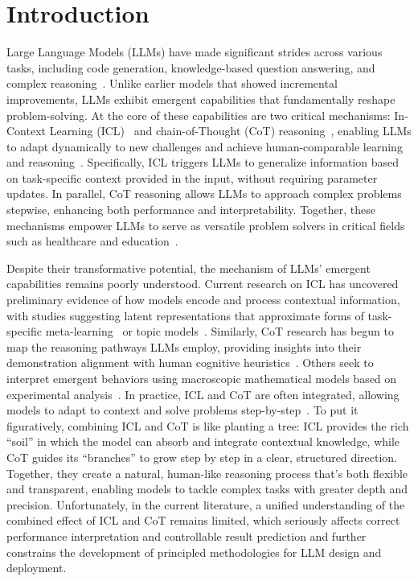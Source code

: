 \section{Introduction}
Large Language Models (LLMs) have made significant strides across various tasks, including code generation, knowledge-based question answering, and complex reasoning~\citep{zhao2023survey, chang2023survey, pan2023preliminary, qin2024large}. Unlike earlier models that showed incremental improvements, LLMs exhibit emergent capabilities that fundamentally reshape problem-solving. At the core of these capabilities are two critical mechanisms: In-Context Learning (ICL)~\citep{brown2020language,dong2022survey,qin2024what} and chain-of-Thought (CoT) reasoning~\citep{nye2022show,wei2022chain,chen2024unlocking}, enabling LLMs to adapt dynamically to new challenges and achieve human-comparable learning and reasoning~\citep{brown2020language,openai2022gpt35,achiam2023gpt}. Specifically, ICL triggers LLMs to generalize information based on task-specific context provided in the input, without requiring parameter updates. In parallel, CoT reasoning allows LLMs to approach complex problems stepwise, enhancing both performance and interpretability. Together, these mechanisms empower LLMs to serve as versatile problem solvers in critical fields such as healthcare and education~\citep{harrer2023attention,nazi2024large,kasneci2023chatgpt,kung2023performance}.

Despite their transformative potential, the mechanism of LLMs’ emergent capabilities remains poorly understood. Current research on ICL has uncovered preliminary evidence of how models encode and process contextual information, with studies suggesting latent representations that approximate forms of task-specific meta-learning~\citep{wang-etal-2023-label, von2023transformers} or topic models~\citep{wang2023large}.
Similarly, CoT research has begun to map the reasoning pathways LLMs employ, providing insights into their demonstration alignment with human cognitive heuristics~\citep{madaan2023makes, wang2023towards}. Others seek to interpret emergent behaviors using macroscopic mathematical models based on experimental analysis~\citep{feng2024towards, chen2024unlocking}.
In practice, ICL and CoT are often integrated, allowing models to adapt to context and solve problems step-by-step~\citep{kojima2022large, hu2023tree, qin2023cross, zhuang2023through, chen-etal-2024-m3cot}. To put it figuratively, combining ICL and CoT is like planting a tree: ICL provides the rich ``soil'' in which the model can absorb and integrate contextual knowledge, while CoT guides its ``branches'' to grow step by step in a clear, structured direction. Together, they create a natural, human-like reasoning process that’s both flexible and transparent, enabling models to tackle complex tasks with greater depth and precision.
Unfortunately, in the current literature, a unified understanding of the combined effect of ICL and CoT remains limited, which seriously affects correct performance interpretation and controllable result prediction and further constrains the development of principled methodologies for LLM design and deployment.

